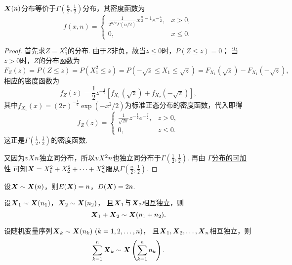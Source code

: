 \begin{theorem}\label{theorem:数理统计的基础知识.卡方分布的密度函数}
\(\boldsymbol{X}(n)\)分布等价于\(\Gamma\left(\frac{n}{2},\frac{1}{2}\right)\)分布，其密度函数为\[
f(x,n) = \left\{ \begin{array}{cl}
\frac{1}{2^{n/2} \Gamma(n/2)} x^{\frac{n}{2}-1} e^{-\frac{x}{2}}, & x > 0, \\
0, & x \leqslant 0.
\end{array} \right.
\]
\begin{proof}
首先求\(Z=X_1^2\)的分布.
由于\(Z\)非负，故当\(z \leqslant 0\)时，\(P(Z \leqslant z) = 0\)；
当\(z > 0\)时，\(Z\)的分布函数为\[
F_Z(z) = P(Z \leqslant z)
= P(X_1^2 \leqslant z)
= P(-\sqrt{z} \leqslant X_1 \leqslant \sqrt{z})
= F_{X_1}(\sqrt{z}) - F_{X_1}(-\sqrt{z}),
\]相应的密度函数为\[
f_Z(z) = \frac{1}{2} z^{-\frac{1}{2}} \left[
f_{X_1}(\sqrt{z}) + f_{X_2}(-\sqrt{z})
\right],
\]其中\(f_{X_1}(x) = (2\pi)^{-\frac{1}{2}} \exp(-x^2/2)\)为标准正态分布的密度函数，代入即得\[
f_Z(z) = \left\{ \begin{array}{cl}
\frac{1}{\sqrt{2\pi}} z^{-\frac{1}{2}} e^{-\frac{z}{2}}, & z>0, \\
0, & z \leqslant 0.
\end{array} \right.
\]这正是\(\Gamma\left(\frac{1}{2},\frac{1}{2}\right)\)的密度函数.

又因为\(v{X}{n}\)独立同分布，所以\(v{X^2}{n}\)也独立同分布于\(\Gamma\left(\frac{1}{2},\frac{1}{2}\right)\).
再由 \hyperref[theorem:多维随机变量及其分布.伽马分布的可加性1]{\(\Gamma\)分布的可加性} 可知\(\boldsymbol{X} = X_1^2+X_2^2+\dotsb+X_n^2\)服从\(\Gamma\left(\frac{n}{2},\frac{1}{2}\right)\).
\end{proof}
\end{theorem}

\begin{corollary}\label{theorem:数理统计的基础知识.卡方分布的数字特征}
设\(\boldsymbol{X} \sim \boldsymbol{X}(n)\)，则\(E(\boldsymbol{X}) = n\)，\(D(\boldsymbol{X}) = 2n\).
\end{corollary}

\begin{theorem}[可加性]\label{theorem:数理统计的基础知识.卡方分布的可加性1}
设\(\boldsymbol{X}_1 \sim \boldsymbol{X}(n_1)\)，\(\boldsymbol{X}_2 \sim \boldsymbol{X}(n_2)\)，%
且\(\boldsymbol{X}_1\)与\(\boldsymbol{X}_2\)相互独立，则\[
\boldsymbol{X}_1 + \boldsymbol{X}_2 \sim \boldsymbol{X}(n_1+n_2).
\]
\end{theorem}

\begin{corollary}\label{theorem:数理统计的基础知识.卡方分布的可加性2}
设随机变量序列\(\x_k \sim \x(n_k)\ (k=1,2,\dotsc,n)\)，%
且\(\boldsymbol{X}_1,\boldsymbol{X}_2,\dotsc,\boldsymbol{X}_n\)相互独立，则\[
\sum\limits_{k=1}^n{\boldsymbol{X}_k} \sim \boldsymbol{X}\left(\sum\limits_{k=1}^n{n_k}\right).
\]
\end{corollary}

